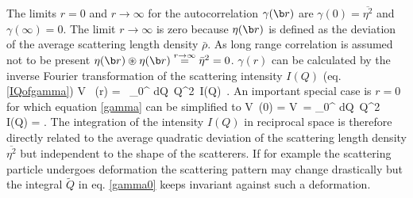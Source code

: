 The limits $r=0$ and $r\rightarrow\infty$ for the autocorrelation $\gamma(\B{r})$ are
$\gamma(0) = \overline{\eta^2}$ and $\gamma(\infty)=0$.
The limit $r\rightarrow\infty$ is zero because $\eta(\B{r})$ is defined as the deviation
of the average scattering length density $\bar\rho$. As long range correlation is assumed
not to be present  $\eta(\B{r}) \circledast \eta(\B{r})
\stackrel{r\rightarrow\infty}{=} \bar \eta^2=0$.
$\gamma(r)$ can be calculated by the inverse Fourier transformation of the scattering
intensity $I(Q)$ (eq. \ref{IQofgamma})
\BE
V \, \gamma(r) =  \, \int_0^{\infty} dQ\, Q^2\, I(Q)\,
 \quad .
\label{gamma}
\EE
An important special case is $r=0$ for which equation \ref{gamma} can be simplified to
\BE
V\, \gamma(0) %
              = V\, 
              =   \int_0^{\infty} dQ\, Q^2 \,I(Q)
              =  \quad .
\label{gamma0}
\EE
The integration of the intensity $I(Q)$ in reciprocal space is therefore directly related
to the average quadratic deviation of the scattering length density $\overline{\eta^2}$
but independent to the shape of the scatterers. If for example the scattering particle undergoes
deformation the scattering pattern may change drastically but the integral $\tilde Q$ in eq.
\ref{gamma0} keeps invariant against such a deformation.

